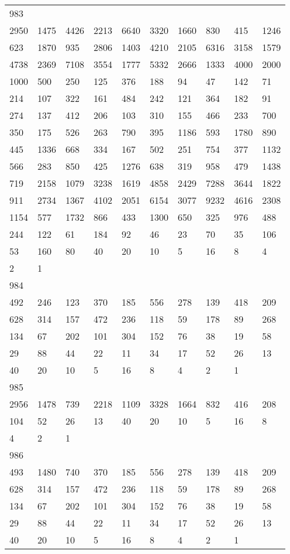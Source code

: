 \begin{longtable}{*{10}{l}}
983&&&&&&&&&\\
2950& 1475& 4426& 2213& 6640& 3320& 1660& 830& 415& 1246\\
623& 1870& 935& 2806& 1403& 4210& 2105& 6316& 3158& 1579\\
4738& 2369& 7108& 3554& 1777& 5332& 2666& 1333& 4000& 2000\\
1000& 500& 250& 125& 376& 188& 94& 47& 142& 71\\
214& 107& 322& 161& 484& 242& 121& 364& 182& 91\\
274& 137& 412& 206& 103& 310& 155& 466& 233& 700\\
350& 175& 526& 263& 790& 395& 1186& 593& 1780& 890\\
445& 1336& 668& 334& 167& 502& 251& 754& 377& 1132\\
566& 283& 850& 425& 1276& 638& 319& 958& 479& 1438\\
719& 2158& 1079& 3238& 1619& 4858& 2429& 7288& 3644& 1822\\
911& 2734& 1367& 4102& 2051& 6154& 3077& 9232& 4616& 2308\\
1154& 577& 1732& 866& 433& 1300& 650& 325& 976& 488\\
244& 122& 61& 184& 92& 46& 23& 70& 35& 106\\
53& 160& 80& 40& 20& 10& 5& 16& 8& 4\\
2& 1& \\

984&&&&&&&&&\\
492& 246& 123& 370& 185& 556& 278& 139& 418& 209\\
628& 314& 157& 472& 236& 118& 59& 178& 89& 268\\
134& 67& 202& 101& 304& 152& 76& 38& 19& 58\\
29& 88& 44& 22& 11& 34& 17& 52& 26& 13\\
40& 20& 10& 5& 16& 8& 4& 2& 1& \\

985&&&&&&&&&\\
2956& 1478& 739& 2218& 1109& 3328& 1664& 832& 416& 208\\
104& 52& 26& 13& 40& 20& 10& 5& 16& 8\\
4& 2& 1& \\

986&&&&&&&&&\\
493& 1480& 740& 370& 185& 556& 278& 139& 418& 209\\
628& 314& 157& 472& 236& 118& 59& 178& 89& 268\\
134& 67& 202& 101& 304& 152& 76& 38& 19& 58\\
29& 88& 44& 22& 11& 34& 17& 52& 26& 13\\
40& 20& 10& 5& 16& 8& 4& 2& 1& \\


\end{longtable}
